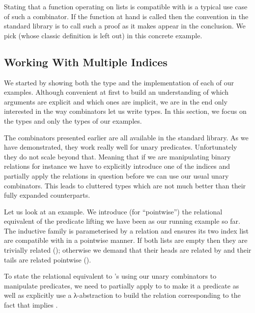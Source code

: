 
Stating that a function operating on lists is compatible with  is
a typical use case of such a combinator. If the function at hand is called
 then the convention in the standard library is to call such a proof
 as it makes  appear in the conclusion. We pick 
(whose classic definition is left out) in this concrete example.


\subsection{Working With Multiple Indices}

We started by showing both the type and the implementation of each of our
examples. Although convenient at first to build an understanding of which
arguments are explicit and which ones are implicit, we are in the end only
interested in the way combinators let us write types. In this section, we
focus on the types and only the types of our examples.

The combinators presented earlier are all available in the standard library.
As we have demonstrated, they work really well for unary predicates. Unfortunately
they do not scale beyond that. Meaning that if we are manipulating binary relations
for instance we have to explicitly introduce one of the indices and partially apply
the relations in question before we can use our usual unary combinators. This leads
to cluttered types which are not much better than their fully expanded counterparts.

Let us look at an example. We introduce  (for ``pointwise'') the relational
equivalent of the predicate lifting  we have been as our running example so
far. The inductive family  is parameterised by a relation  and ensures
its two index list are compatible with  in a pointwise manner. If both lists
are empty then they are trivially related (\AIC{[]}); otherwise we demand that their
heads are related by  and their tails are related pointwise ().


To state the relational equivalent to 's  using our unary
combinators to manipulate predicates, we need to partially apply  to
 to make it a predicate as well as explicitly use a λ-abstraction to
build the relation corresponding to the fact that  implies .

